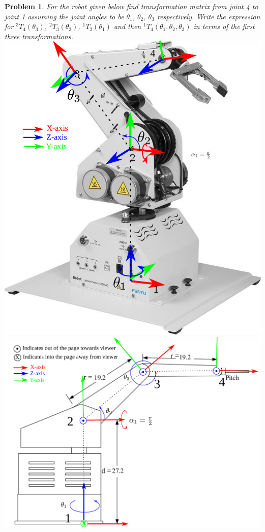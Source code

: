 \documentclass[twocolumn]{article}
\newtheorem{prob}{Problem}
\begin{document}
\begin{prob}
  For the robot given below find transformation matrix from joint 4 to joint 1
  assuming the joint angles to be  $\theta_1$, $\theta_2$, $\theta_3$
  respectively. Write the expression for ${}^3T_4(\theta_3)$, ${}^2T_3(\theta_2)$, ${}^1T_2(\theta_1)$
  and then ${}^1T_4(\theta_1, \theta_2, \theta_3)$ in terms of the first three transformations.
  \\
  \includegraphics[width=\linewidth]{robot3D.pdf}
  \\
  \includegraphics[width=\linewidth]{robot.pdf}
\end{prob}
\end{document}
